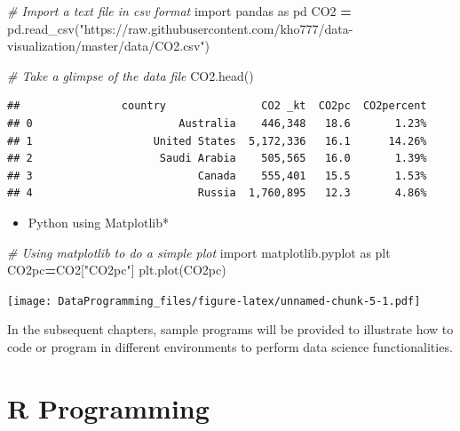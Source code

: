 \documentclass[]{book}
\newenvironment{Shaded}{\begin{snugshade}}{\end{snugshade}}
\newcommand{\CommentTok}[1]{\textcolor[rgb]{0.56,0.35,0.01}{\textit{#1}}}
\newcommand{\ImportTok}[1]{#1}
\newcommand{\NormalTok}[1]{#1}
\newcommand{\OperatorTok}[1]{\textcolor[rgb]{0.81,0.36,0.00}{\textbf{#1}}}
\newcommand{\StringTok}[1]{\textcolor[rgb]{0.31,0.60,0.02}{#1}}
\providecommand{\tightlist}{%
  \setlength{\itemsep}{0pt}\setlength{\parskip}{0pt}}
\begin{document}
\begin{Shaded}
\begin{Highlighting}[]

\CommentTok{# Import a text file in csv format}
\ImportTok{import}\NormalTok{ pandas }\ImportTok{as}\NormalTok{ pd}
\NormalTok{CO2 }\OperatorTok{=}\NormalTok{ pd.read_csv(}\StringTok{"https://raw.githubusercontent.com/kho777/data-visualization/master/data/CO2.csv"}\NormalTok{)}

\CommentTok{# Take a glimpse of the data file}
\NormalTok{CO2.head()}
\end{Highlighting}
\end{Shaded}

\begin{verbatim}
##                country               CO2 _kt  CO2pc  CO2percent
## 0                       Australia    446,348   18.6       1.23%
## 1                   United States  5,172,336   16.1      14.26%
## 2                    Saudi Arabia    505,565   16.0       1.39%
## 3                          Canada    555,401   15.5       1.53%
## 4                          Russia  1,760,895   12.3       4.86%
\end{verbatim}

\begin{itemize}
\tightlist
\item
  Python using Matplotlib*
\end{itemize}

\begin{Shaded}
\begin{Highlighting}[]
\CommentTok{# Using matplotlib to do a simple plot}
\ImportTok{import}\NormalTok{ matplotlib.pyplot }\ImportTok{as}\NormalTok{ plt}
\NormalTok{CO2pc}\OperatorTok{=}\NormalTok{CO2[}\StringTok{"CO2pc"}\NormalTok{]}
\NormalTok{plt.plot(CO2pc)}
\end{Highlighting}
\end{Shaded}

\texttt{[image: DataProgramming\_files/figure-latex/unnamed-chunk-5-1.pdf]}

In the subsequent chapters, sample programs will be provided to illustrate how to code or program in different environments to perform data science functionalities.

\hypertarget{r-programming}{%
\chapter{R Programming}\label{r-programming}}
\end{document}
